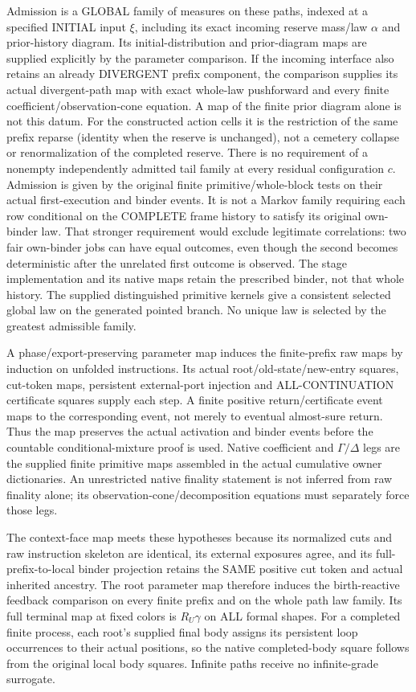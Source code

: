 \documentclass[11pt]{article}
\begin{document}
Admission is a GLOBAL family of measures on these paths, indexed at a specified INITIAL input $\xi$, including its exact incoming reserve mass/law $\alpha$ and prior-history diagram. Its initial-distribution and prior-diagram maps are supplied explicitly by the parameter comparison. If the incoming interface also retains an already DIVERGENT prefix component, the comparison supplies its actual divergent-path map with exact whole-law pushforward and every finite coefficient/observation-cone equation. A map of the finite prior diagram alone is not this datum. For the constructed action cells it is the restriction of the same prefix reparse (identity when the reserve is unchanged), not a cemetery collapse or renormalization of the completed reserve. There is no requirement of a nonempty independently admitted tail family at every residual configuration $c$. Admission is given by the original finite primitive/whole-block tests on their actual first-execution and binder events. It is not a Markov family requiring each row conditional on the COMPLETE frame history to satisfy its original own-binder law. That stronger requirement would exclude legitimate correlations: two fair own-binder jobs can have equal outcomes, even though the second becomes deterministic after the unrelated first outcome is observed. The stage implementation and its native maps retain the prescribed binder, not that whole history. The supplied distinguished primitive kernels give a consistent selected global law on the generated pointed branch. No unique law is selected by the greatest admissible family.

A phase/export-preserving parameter map induces the finite-prefix raw maps by induction on unfolded instructions. Its actual root/old-state/new-entry squares, cut-token maps, persistent external-port injection and ALL-CONTINUATION certificate squares supply each step. A finite positive return/certificate event maps to the corresponding event, not merely to eventual almost-sure return. Thus the map preserves the actual activation and binder events before the countable conditional-mixture proof is used. Native coefficient and $\Gamma/\Delta$ legs are the supplied finite primitive maps assembled in the actual cumulative owner dictionaries. An unrestricted native finality statement is not inferred from raw finality alone; its observation-cone/decomposition equations must separately force those legs.

The context-face map meets these hypotheses because its normalized cuts and raw instruction skeleton are identical, its external exposures agree, and its full-prefix-to-local binder projection retains the SAME positive cut token and actual inherited ancestry. The root parameter map therefore induces the birth-reactive feedback comparison on every finite prefix and on the whole path law family. Its full terminal map at fixed colors is $R_U\gamma$ on ALL formal shapes. For a completed finite process, each root's supplied final body assigns its persistent loop occurrences to their actual positions, so the native completed-body square follows from the original local body squares. Infinite paths receive no infinite-grade surrogate.
\end{document}
